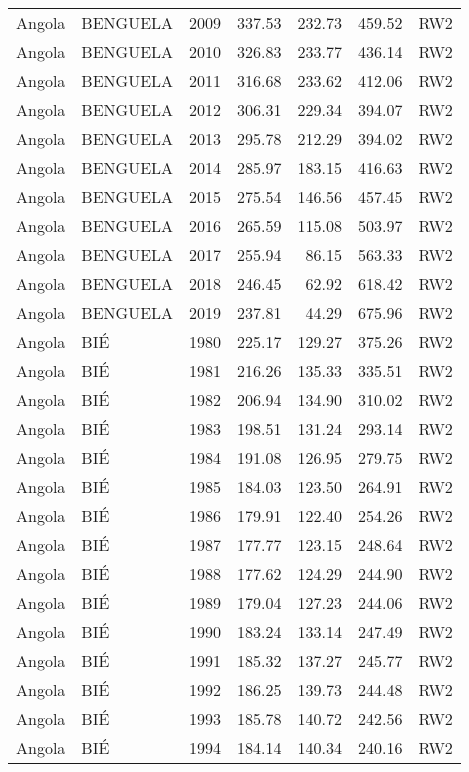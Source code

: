 \begin{longtable}{lllrrrl}
  Angola & BENGUELA & 2009 & 337.53 & 232.73 & 459.52 & RW2 \\ 
  Angola & BENGUELA & 2010 & 326.83 & 233.77 & 436.14 & RW2 \\ 
  Angola & BENGUELA & 2011 & 316.68 & 233.62 & 412.06 & RW2 \\ 
  Angola & BENGUELA & 2012 & 306.31 & 229.34 & 394.07 & RW2 \\ 
  Angola & BENGUELA & 2013 & 295.78 & 212.29 & 394.02 & RW2 \\ 
  Angola & BENGUELA & 2014 & 285.97 & 183.15 & 416.63 & RW2 \\ 
  Angola & BENGUELA & 2015 & 275.54 & 146.56 & 457.45 & RW2 \\ 
  Angola & BENGUELA & 2016 & 265.59 & 115.08 & 503.97 & RW2 \\ 
  Angola & BENGUELA & 2017 & 255.94 & 86.15 & 563.33 & RW2 \\ 
  Angola & BENGUELA & 2018 & 246.45 & 62.92 & 618.42 & RW2 \\ 
  Angola & BENGUELA & 2019 & 237.81 & 44.29 & 675.96 & RW2 \\ 
  Angola & BIÉ & 1980 & 225.17 & 129.27 & 375.26 & RW2 \\ 
  Angola & BIÉ & 1981 & 216.26 & 135.33 & 335.51 & RW2 \\ 
  Angola & BIÉ & 1982 & 206.94 & 134.90 & 310.02 & RW2 \\ 
  Angola & BIÉ & 1983 & 198.51 & 131.24 & 293.14 & RW2 \\ 
  Angola & BIÉ & 1984 & 191.08 & 126.95 & 279.75 & RW2 \\ 
  Angola & BIÉ & 1985 & 184.03 & 123.50 & 264.91 & RW2 \\ 
  Angola & BIÉ & 1986 & 179.91 & 122.40 & 254.26 & RW2 \\ 
  Angola & BIÉ & 1987 & 177.77 & 123.15 & 248.64 & RW2 \\ 
  Angola & BIÉ & 1988 & 177.62 & 124.29 & 244.90 & RW2 \\ 
  Angola & BIÉ & 1989 & 179.04 & 127.23 & 244.06 & RW2 \\ 
  Angola & BIÉ & 1990 & 183.24 & 133.14 & 247.49 & RW2 \\ 
  Angola & BIÉ & 1991 & 185.32 & 137.27 & 245.77 & RW2 \\ 
  Angola & BIÉ & 1992 & 186.25 & 139.73 & 244.48 & RW2 \\ 
  Angola & BIÉ & 1993 & 185.78 & 140.72 & 242.56 & RW2 \\ 
  Angola & BIÉ & 1994 & 184.14 & 140.34 & 240.16 & RW2 \\ 

\end{longtable}

